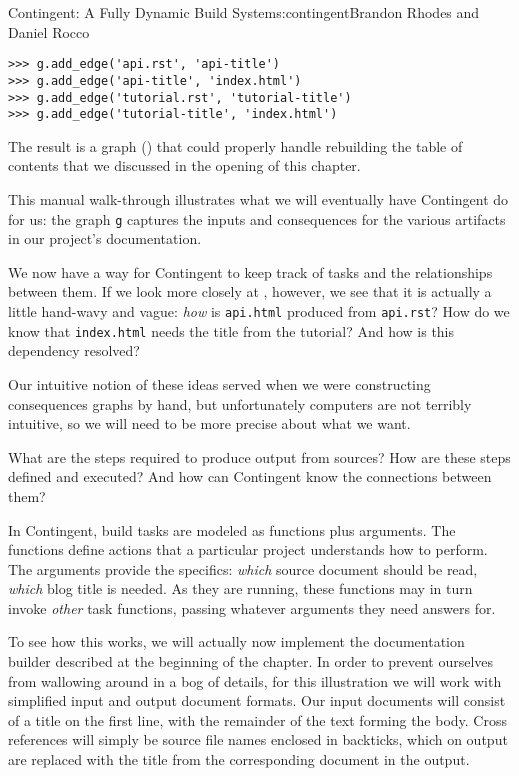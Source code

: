 \begin{aosachapter}{Contingent: A Fully Dynamic Build System}{s:contingent}{Brandon Rhodes and Daniel Rocco}
\begin{verbatim}
>>> g.add_edge('api.rst', 'api-title')
>>> g.add_edge('api-title', 'index.html')
>>> g.add_edge('tutorial.rst', 'tutorial-title')
>>> g.add_edge('tutorial-title', 'index.html')
\end{verbatim}

The result is a graph () that could
properly handle rebuilding the table of contents that we discussed in
the opening of this chapter.


This manual walk-through illustrates what we will eventually have
Contingent do for us: the graph \texttt{g} captures the inputs and
consequences for the various artifacts in our project's documentation.

\label{learning-connections}

We now have a way for Contingent to keep track of tasks and the
relationships between them. If we look more closely at
, however, we see that it is actually
a little hand-wavy and vague: \emph{how} is \texttt{api.html} produced
from \texttt{api.rst}? How do we know that \texttt{index.html} needs the
title from the tutorial? And how is this dependency resolved?

Our intuitive notion of these ideas served when we were constructing
consequences graphs by hand, but unfortunately computers are not
terribly intuitive, so we will need to be more precise about what we
want.

What are the steps required to produce output from sources? How are
these steps defined and executed? And how can Contingent know the
connections between them?

In Contingent, build tasks are modeled as functions plus arguments. The
functions define actions that a particular project understands how to
perform. The arguments provide the specifics: \emph{which} source
document should be read, \emph{which} blog title is needed. As they are
running, these functions may in turn invoke \emph{other} task functions,
passing whatever arguments they need answers for.

To see how this works, we will actually now implement the documentation
builder described at the beginning of the chapter. In order to prevent
ourselves from wallowing around in a bog of details, for this
illustration we will work with simplified input and output document
formats. Our input documents will consist of a title on the first line,
with the remainder of the text forming the body. Cross references will
simply be source file names enclosed in backticks, which on output are
replaced with the title from the corresponding document in the output.


\end{aosachapter}

